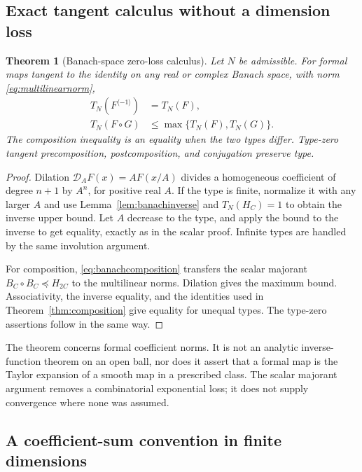 \documentclass[11pt,a4paper]{article}
\numberwithin{equation}{section}
\newtheorem{theorem}{Theorem}[section]
\theoremstyle{definition}
\theoremstyle{remark}
\newcommand{\Type}{T_N}
\newcommand{\inv}[1]{#1^{\langle-1\rangle}}
\begin{document}
\subsection{Exact tangent calculus without a dimension loss}

\begin{theorem}[Banach-space zero-loss calculus]
\label{thm:banach}
Let $N$ be admissible. For formal maps tangent to the identity on any
real or complex Banach space, with norm \eqref{eq:multilinearnorm},
\begin{align}
 \Type(\inv F)&=\Type(F),\label{eq:banachinverseexact}\\
 \Type(F\circ G)&\le\max\{\Type(F),\Type(G)\}.
 \label{eq:banachcompositionexact}
\end{align}
The composition inequality is an equality when the two types differ.
Type-zero tangent precomposition, postcomposition, and conjugation
preserve type.
\end{theorem}
\begin{proof}
Dilation $\mathcal D_A F(x)=A F(x/A)$ divides a homogeneous coefficient
of degree $n+1$ by $A^n$, for positive real $A$. If the type is finite,
normalize it with any larger $A$ and use
Lemma~\ref{lem:banachinverse} and $\Type(H_C)=1$ to obtain the inverse
upper bound. Let $A$ decrease to the type, and apply the bound to the
inverse to get equality, exactly as in the scalar proof. Infinite types
are handled by the same involution argument.

For composition, \eqref{eq:banachcomposition} transfers the scalar
majorant $B_C\circ B_C\preceq H_{2C}$ to the multilinear norms.
Dilation gives the maximum bound. Associativity, the inverse equality,
and the identities used in Theorem~\ref{thm:composition} give equality
for unequal types. The type-zero assertions follow in the same way.
\end{proof}

The theorem concerns formal coefficient norms. It is not an analytic
inverse-function theorem on an open ball, nor does it assert that a
formal map is the Taylor expansion of a smooth map in a prescribed class.
The scalar majorant argument removes a combinatorial exponential loss;
it does not supply convergence where none was assumed.

\subsection{A coefficient-sum convention in finite dimensions}
\end{document}
